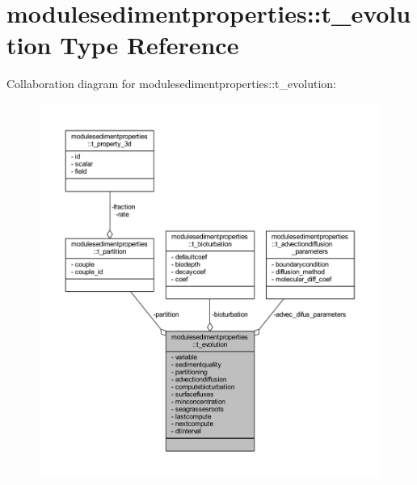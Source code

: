 \hypertarget{structmodulesedimentproperties_1_1t__evolution}{}\section{modulesedimentproperties\+:\+:t\+\_\+evolution Type Reference}
\label{structmodulesedimentproperties_1_1t__evolution}


Collaboration diagram for modulesedimentproperties\+:\+:t\+\_\+evolution\+:\nopagebreak
\begin{figure}[H]
\begin{center}
\leavevmode
\includegraphics[width=350pt]{structmodulesedimentproperties_1_1t__evolution__coll__graph}
\end{center}
\end{figure}
